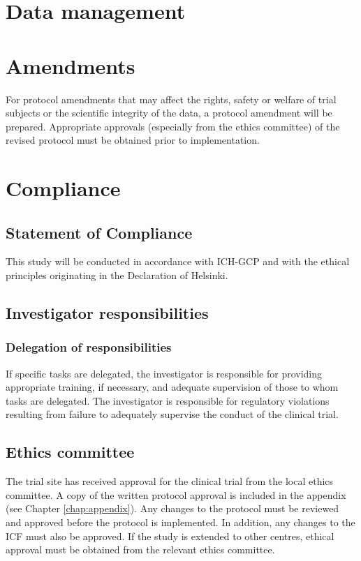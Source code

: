\section{Data management}

\section{Amendments}
For protocol amendments that may affect the rights, safety or welfare of trial subjects or the scientific integrity of the data, a protocol amendment will be prepared. Appropriate approvals (especially from the ethics committee) of the revised protocol must be obtained prior to implementation.

\section{Compliance}
\subsection{Statement of Compliance}
This study will be conducted in accordance with ICH-GCP and with the ethical principles originating in the Declaration of Helsinki. 

\subsection{Investigator responsibilities}

\subsubsection{Delegation of responsibilities}
If specific tasks are delegated, the investigator is responsible for providing appropriate training, if necessary, and adequate supervision of those to whom tasks are delegated. The investigator is responsible for regulatory violations resulting from failure to adequately supervise the conduct of the clinical trial.

\subsection{Ethics committee}
The trial site has received approval for the clinical trial from the local ethics committee. A copy of the written protocol approval is included in the appendix (see Chapter \ref{chap:appendix}). Any changes to the protocol must be reviewed and approved before the protocol is implemented. In addition, any changes to the \ac{ICF} must also be approved. If the study is extended to other centres, ethical approval must be obtained from the relevant ethics committee.

